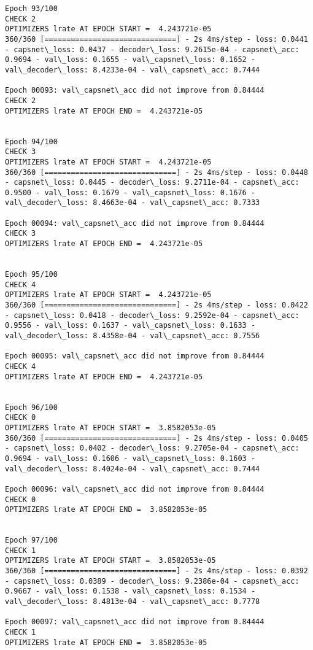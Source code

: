\documentclass[11pt]{article}
\begin{document}
\begin{Verbatim}[commandchars=\\\{\}]
Epoch 93/100
CHECK 2
OPTIMIZERS lrate AT EPOCH START =  4.243721e-05
360/360 [==============================] - 2s 4ms/step - loss: 0.0441 - capsnet\_loss: 0.0437 - decoder\_loss: 9.2615e-04 - capsnet\_acc: 0.9694 - val\_loss: 0.1655 - val\_capsnet\_loss: 0.1652 - val\_decoder\_loss: 8.4233e-04 - val\_capsnet\_acc: 0.7444

Epoch 00093: val\_capsnet\_acc did not improve from 0.84444
CHECK 2
OPTIMIZERS lrate AT EPOCH END =  4.243721e-05 


Epoch 94/100
CHECK 3
OPTIMIZERS lrate AT EPOCH START =  4.243721e-05
360/360 [==============================] - 2s 4ms/step - loss: 0.0448 - capsnet\_loss: 0.0445 - decoder\_loss: 9.2711e-04 - capsnet\_acc: 0.9500 - val\_loss: 0.1679 - val\_capsnet\_loss: 0.1676 - val\_decoder\_loss: 8.4663e-04 - val\_capsnet\_acc: 0.7333

Epoch 00094: val\_capsnet\_acc did not improve from 0.84444
CHECK 3
OPTIMIZERS lrate AT EPOCH END =  4.243721e-05 


Epoch 95/100
CHECK 4
OPTIMIZERS lrate AT EPOCH START =  4.243721e-05
360/360 [==============================] - 2s 4ms/step - loss: 0.0422 - capsnet\_loss: 0.0418 - decoder\_loss: 9.2592e-04 - capsnet\_acc: 0.9556 - val\_loss: 0.1637 - val\_capsnet\_loss: 0.1633 - val\_decoder\_loss: 8.4358e-04 - val\_capsnet\_acc: 0.7556

Epoch 00095: val\_capsnet\_acc did not improve from 0.84444
CHECK 4
OPTIMIZERS lrate AT EPOCH END =  4.243721e-05 


Epoch 96/100
CHECK 0
OPTIMIZERS lrate AT EPOCH START =  3.8582053e-05
360/360 [==============================] - 2s 4ms/step - loss: 0.0405 - capsnet\_loss: 0.0402 - decoder\_loss: 9.2705e-04 - capsnet\_acc: 0.9694 - val\_loss: 0.1606 - val\_capsnet\_loss: 0.1603 - val\_decoder\_loss: 8.4024e-04 - val\_capsnet\_acc: 0.7444

Epoch 00096: val\_capsnet\_acc did not improve from 0.84444
CHECK 0
OPTIMIZERS lrate AT EPOCH END =  3.8582053e-05 


Epoch 97/100
CHECK 1
OPTIMIZERS lrate AT EPOCH START =  3.8582053e-05
360/360 [==============================] - 2s 4ms/step - loss: 0.0392 - capsnet\_loss: 0.0389 - decoder\_loss: 9.2386e-04 - capsnet\_acc: 0.9667 - val\_loss: 0.1538 - val\_capsnet\_loss: 0.1534 - val\_decoder\_loss: 8.4813e-04 - val\_capsnet\_acc: 0.7778

Epoch 00097: val\_capsnet\_acc did not improve from 0.84444
CHECK 1
OPTIMIZERS lrate AT EPOCH END =  3.8582053e-05 



\end{Verbatim}
\end{document}

